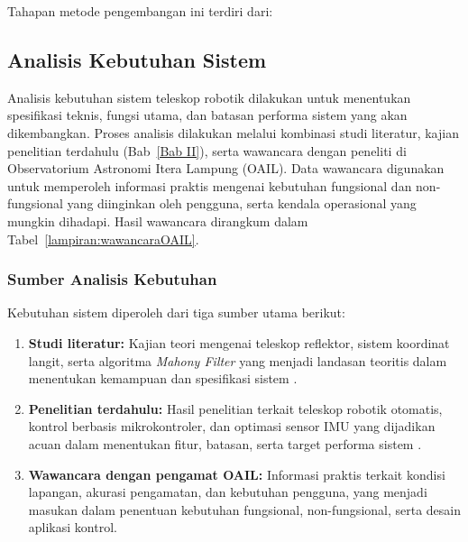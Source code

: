Tahapan metode pengembangan ini terdiri dari:

\subsection{Analisis Kebutuhan Sistem} \label{III.AnalisisKebutuhan}

Analisis kebutuhan sistem teleskop robotik dilakukan untuk menentukan spesifikasi teknis, fungsi utama, dan batasan performa sistem yang akan dikembangkan. Proses analisis dilakukan melalui kombinasi studi literatur, kajian penelitian terdahulu (Bab~\ref{Bab II}), serta wawancara dengan peneliti di Observatorium Astronomi Itera Lampung (OAIL). Data wawancara digunakan untuk memperoleh informasi praktis mengenai kebutuhan fungsional dan non-fungsional yang diinginkan oleh pengguna, serta kendala operasional yang mungkin dihadapi. Hasil wawancara dirangkum dalam Tabel~\ref{lampiran:wawancaraOAIL}.

\subsubsection{Sumber Analisis Kebutuhan}
Kebutuhan sistem diperoleh dari tiga sumber utama berikut:
\begin{enumerate}[noitemsep]
	\item \textbf{Studi literatur:} Kajian teori mengenai teleskop reflektor, sistem koordinat langit, serta algoritma \textit{Mahony Filter} yang menjadi landasan teoritis dalam menentukan kemampuan dan spesifikasi sistem \cite{Bradley2014,Ryden2010,Maton2024,MinhLongHoang2022}.
	\item \textbf{Penelitian terdahulu:} Hasil penelitian terkait teleskop robotik otomatis, kontrol berbasis mikrokontroler, dan optimasi sensor IMU yang dijadikan acuan dalam menentukan fitur, batasan, serta target performa sistem \cite{Hadi2022,Rangana2022,Malasan2025,Burhanuddin2014}.
	\item \textbf{Wawancara dengan pengamat OAIL:} Informasi praktis terkait kondisi lapangan, akurasi pengamatan, dan kebutuhan pengguna, yang menjadi masukan dalam penentuan kebutuhan fungsional, non-fungsional, serta desain aplikasi kontrol.
\end{enumerate}

